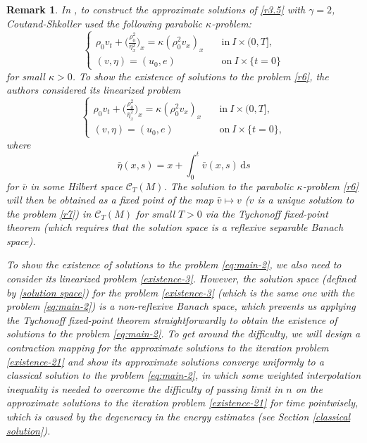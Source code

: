 \documentclass[11pt, reqno]{amsart}
\newcommand{\diff}{\mathrm{d}}
\newtheorem{remark}{Remark}
\numberwithin{equation}{section}
\begin{document}
\begin{remark}\label{re:main-5}
In \cite{MR2779087}, to construct the approximate solutions of \eqref{r3.5} with \(\gamma=2\), Coutand-Shkoller used the following parabolic \(\kappa\)-problem:
\begin{equation}\label{r6}
\begin{cases}
\rho_0v_t+\big({\frac{\rho_0^2}{\eta_x^2}}\big)_x
=\kappa(\rho_0^2v_x)_x &\quad \mbox{in}\ I\times (0,T],\\
(v,\eta)=(u_0,e) &\quad \mbox{on}\ I\times \{t=0\}
\end{cases}
\end{equation}
for small \( \kappa>0\). To show the existence of solutions to the problem \eqref{r6}, the authors considered its linearized problem  
\begin{equation}\label{r7}
\begin{cases}
\rho_0v_t+\big({\frac{\rho_0^2}{\bar{\eta}_x^2}}\big)_x
=\kappa(\rho_0^2v_x)_x &\quad \mbox{in}\ I\times (0,T],\\
(v,\eta)=(u_0,e) &\quad \mbox{on}\ I\times \{t=0\},
\end{cases}
\end{equation}
where 
\[\bar{\eta}(x,s)=x+\int_0^t\bar{v}(x,s)\,\diff s\]
for \(\bar{v}\) in some Hilbert space \(\mathcal{C}_T(M)\). The solution to the parabolic \(\kappa\)-problem \eqref{r6} will then be obtained as a fixed point of the map \(\bar{v}\mapsto v\) (\(v\) is a unique solution to the problem \eqref{r7}) in \(\mathcal{C}_T(M)\) for small \(T>0\)  via the Tychonoff fixed-point theorem (which requires that the solution space is a reflexive separable Banach space). 


To show the existence of solutions to the problem \eqref{eq:main-2}, we also need to consider its linearized problem \eqref{existence-3}. However, the solution space (defined by \eqref{solution space}) for the problem \eqref{existence-3} (which is the same one with the problem \eqref{eq:main-2}) is a non-reflexive Banach space, which prevents us applying the Tychonoff fixed-point theorem straightforwardly to obtain the  existence of solutions to the problem \eqref{eq:main-2}. To get around the difficulty, we will design a contraction mapping for the approximate solutions to the iteration problem \eqref{existence-21} and show its approximate solutions converge uniformly to a classical solution to the problem \eqref{eq:main-2}, in which some weighted interpolation inequality is needed to overcome the difficulty of passing limit in \(n\) on the approximate solutions to the iteration problem \eqref{existence-21}
for time pointwisely, which is caused by the degeneracy in the energy estimates (see Section \ref{classical solution}).



\end{remark}
\end{document}

